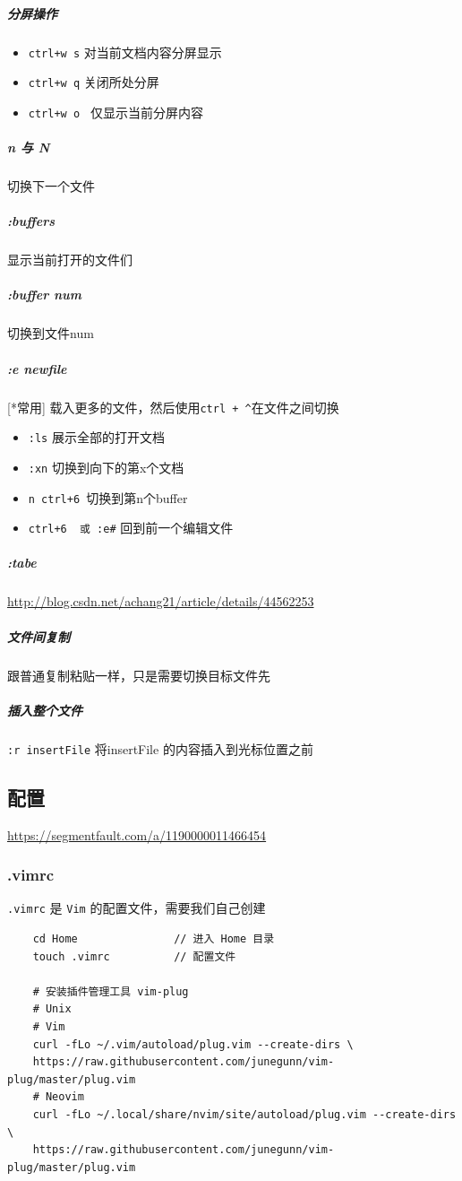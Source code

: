 \documentclass[UTF8,a4paper,12pt]{ctexbook}
\begin{document}
				\subparagraph{分屏操作}
					\begin{itemize}[itemindent = 2em]
						\item \verb|ctrl+w s|   对当前文档内容分屏显示
						\item \verb|ctrl+w q|   关闭所处分屏
						\item \verb|ctrl+w o |  仅显示当前分屏内容
					\end{itemize}
				
				\subparagraph{n 与 N} 切换下一个文件
				\subparagraph{:buffers} 显示当前打开的文件们
				\subparagraph{:buffer num} 切换到文件num
				
				\subparagraph{:e newfile}[*常用] 载入更多的文件，然后使用\verb|ctrl + ^|在文件之间切换
				
					\begin{itemize}[itemindent = 2em]
						\item \verb|:ls|  展示全部的打开文档
						
						\item \verb|:xn|  切换到向下的第x个文档
						
						\item \verb|n ctrl+6 |切换到第n个buffer
						
						\item \verb|ctrl+6  或 :e#|   回到前一个编辑文件
					\end{itemize}
				
				
				
				
				\subparagraph{:tabe}
				\url{http://blog.csdn.net/achang21/article/details/44562253}
				\subparagraph{文件间复制} 跟普通复制粘贴一样，只是需要切换目标文件先
				
				\subparagraph{插入整个文件} \verb|:r insertFile| 将insertFile 的内容插入到光标位置之前 	
		
		\subsection{配置}
			\url{https://segmentfault.com/a/1190000011466454}
			
			\subsubsection{.vimrc}
				\verb|.vimrc| 是 \verb|Vim| 的配置文件，需要我们自己创建
				\begin{lstlisting}
	cd Home               // 进入 Home 目录
	touch .vimrc          // 配置文件
	
	# 安装插件管理工具 vim-plug
	# Unix
	# Vim
	curl -fLo ~/.vim/autoload/plug.vim --create-dirs \
	https://raw.githubusercontent.com/junegunn/vim-plug/master/plug.vim
	# Neovim
	curl -fLo ~/.local/share/nvim/site/autoload/plug.vim --create-dirs \
	https://raw.githubusercontent.com/junegunn/vim-plug/master/plug.vim
				\end{lstlisting}
			
\end{document}
